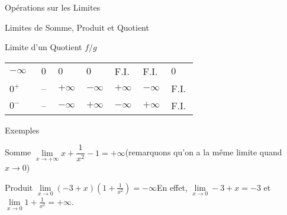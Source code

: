 \documentclass{cours}
\begin{document}
\begin{Gpartie}{Opérations sur les Limites}
\begin{Spartie}{Limites de Somme, Produit et Quotient}
\begin{SSpartie}{Limite d'un Quotient $f/g$}
\begin{table}[H]
\begin{tabular}{ p{0.15\linewidth} *{6}{M{0.08\linewidth}} }
                        $-\infty$ & $0$ & $0$ & $0$ & F.I. & F.I. & $0$ \\
                        $0^+$ & -- & $+\infty$ & $-\infty$ & $+\infty$ & $-\infty$ & F.I. \\
                        $0^-$ & -- & $-\infty$ & $+\infty$ & $-\infty$ & $+\infty$ & F.I. \\ \bottomrule
                    \end{tabular}
                \end{table}
            \end{SSpartie}
            \begin{SSpartie}{Exemples} 
                \begin{SSSpartie}{Somme} 
                    $\lim\limits_{x\to+\infty}x+\dfrac{1}{x^2}-1=+\infty$\quad(remarquons qu'on a la même limite quand $x\to0$)
                \end{SSSpartie}
                \begin{SSSpartie}{Produit} 
                    $\lim\limits_{x\to0}\left(-3+x\right)\left(1+\frac{1}{x^2}\right)=-\infty$\qquad En effet, $\lim\limits_{x\to0}-3+x=-3$ et $\lim\limits_{x\to0}1+\frac{1}{x^2}=+\infty$.
    

\end{SSSpartie}
\end{SSpartie}
\end{Spartie}
\end{Gpartie}
\end{document}
